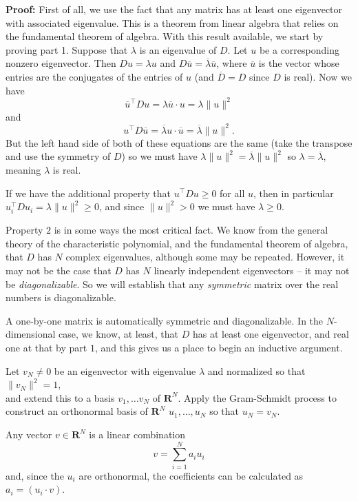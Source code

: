 \documentclass[
  11pt,
  letterpaper,
]{scrbook}
\theoremstyle{plain}
\theoremstyle{remark}
\begin{document}
\textbf{Proof:} First of all, we use the fact that any matrix has at
least one eigenvector with associated eigenvalue. This is a theorem from
linear algebra that relies on the fundamental theorem of algebra. With
this result available, we start by proving part 1. Suppose that
\(\lambda\) is an eigenvalue of \(D\). Let \(u\) be a corresponding
nonzero eigenvector. Then \(Du=\lambda u\) and
\(D\overline{u}=\overline{\lambda}\overline{u}\), where \(\overline{u}\)
is the vector whose entries are the conjugates of the entries of \(u\)
(and \(\overline{D}=D\) since \(D\) is real). Now we have \[
\overline{u}^{\intercal}Du = \lambda \overline{u}\cdot u = \lambda\|u\|^2
\] and \[
u^{\intercal}D\overline{u} = \overline{\lambda}u\cdot \overline{u} = \overline{\lambda}\|u\|^2.
\] But the left hand side of both of these equations are the same (take
the transpose and use the symmetry of \(D\)) so we must have
\(\lambda\|u\|^2 = \overline{\lambda}\|u\|^2\) so
\(\lambda=\overline{\lambda}\), meaning \(\lambda\) is real.

If we have the additional property that \(u^{\intercal}Du\ge 0\) for all
\(u\), then in particular
\(u_{i}^{\intercal}Du_{i} = \lambda\|u\|^2\ge 0\), and since
\(\|u\|^2> 0\) we must have \(\lambda\ge 0\).

Property \(2\) is in some ways the most critical fact. We know from the
general theory of the characteristic polynomial, and the fundamental
theorem of algebra, that \(D\) has \(N\) complex eigenvalues, although
some may be repeated. However, it may not be the case that \(D\) has
\(N\) linearly independent eigenvectors -- it may not be
\emph{diagonalizable}. So we will establish that any \emph{symmetric}
matrix over the real numbers is diagonalizable.

A one-by-one matrix is automatically symmetric and diagonalizable. In
the \(N\)-dimensional case, we know, at least, that \(D\) has at least
one eigenvector, and real one at that by part \(1\), and this gives us a
place to begin an inductive argument.

Let \(v_{N}\not=0\) be an eigenvector with eigenvalue \(\lambda\) and
normalized so that \(\|v_{N}\|^2=1\),\\
and extend this to a basis \(v_{1},\ldots v_{N}\) of \(\mathbf{R}^{N}\).
Apply the Gram-Schmidt process to construct an orthonormal basis of
\(\mathbf{R}^{N}\) \(u_{1},\ldots, u_{N}\) so that \(u_{N}=v_{N}\).

Any vector \(v\in\mathbf{R}^{N}\) is a linear combination \[
v = \sum_{i=1}^{N} a_{i}u_{i}
\] and, since the \(u_{i}\) are orthonormal, the coefficients can be
calculated as \(a_{i}=(u_{i}\cdot v)\).
\end{document}
